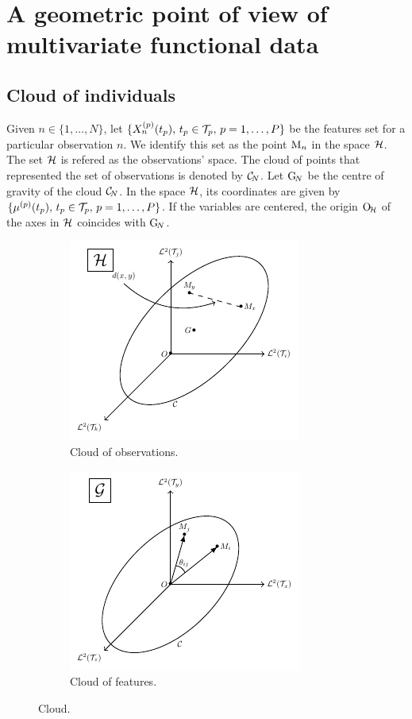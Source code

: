 \section{A geometric point of view of multivariate functional data} %
\label{sec:geometric_point_of_view_mfpca}

\subsection{Cloud of individuals} %
\label{sub:cloud_of_individuals}

Given $n \in \{1, \dots, N\}$, let $\{X_n^{(p)}(t_p),\,t_p \in \mathcal{T}_{p},\,p = 1, \dots, P\}$ be the features set for a particular observation $n$. We identify this set as the point $\mathrm{M}_n$ in the space $\mathcal{H}$. The set $\mathcal{H}$ is refered as the observations' space. The cloud of points that represented the set of observations is denoted by $\mathcal{C}_{\!N}$. Let $\mathrm{G}_{\!N}$ be the centre of gravity of the cloud $\mathcal{C}_{\!N}$. In the space $\mathcal{H}$, its coordinates are given by $\{\mu^{(p)}(t_p),\,t_p \in \mathcal{T}_{p},\,p = 1, \dots, P\}$. If the variables are centered, the origin $\mathrm{O}_{\!\mathcal{H}}$ of the axes in $\mathcal{H}$ coincides with $\mathrm{G}_{\!N}$.

\begin{figure}
    \centering
    \begin{subfigure}[b]{0.49\textwidth}
        \centering
        \includegraphics{figures/cloud_obs.pdf}
        \caption{Cloud of observations.}
        \label{fig:cloud_obs}
    \end{subfigure}
    \hfill
    \begin{subfigure}[b]{0.49\textwidth}
        \centering
        \includegraphics{figures/cloud_features.pdf}
        \caption{Cloud of features.}
        \label{fig:cloud_obs}
    \end{subfigure}
    \caption{Cloud.}
    \label{fig:clouds}
\end{figure}

